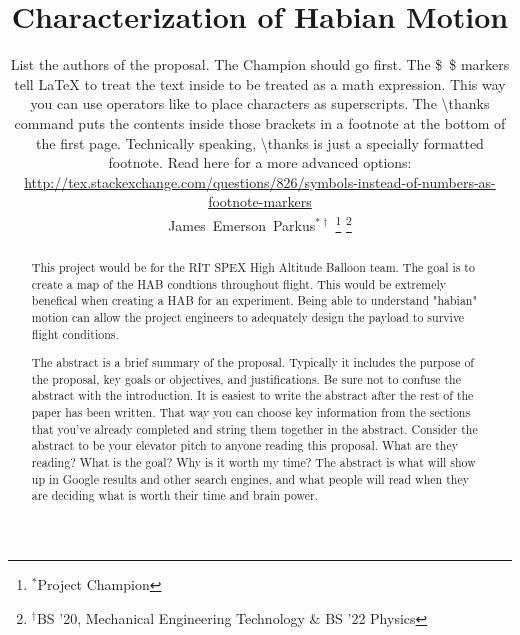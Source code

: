 \documentclass[journal]{SPEXformat}
\title{Characterization of Habian Motion}
\author{
  \begin{help}
    List the authors of the proposal. The Champion should go first.
    The \$~\$ markers tell \LaTeX{} to treat the text inside to be treated as a math expression. This way you can use operators like \textcaret{} to place characters as superscripts.
    The \textbackslash{}thanks command puts the contents inside those brackets in a footnote at the bottom of the first page. Technically speaking, \textbackslash{}thanks is just a specially formatted footnote.
    Read here for a more advanced options:  \url{http://tex.stackexchange.com/questions/826/symbols-instead-of-numbers-as-footnote-markers}
  \end{help}
  James~Emerson~Parkus$^{*\dagger}$%
    \thanks{$^{*}$Project Champion}%
    \thanks{$^{\dagger}$BS '20, Mechanical Engineering Technology \& BS '22 Physics}

}
\newenvironment{help}{
  \ttfamily\footnotesize\sloppy
  \begin{lrbox}{\helpbox}\begin{minipage}{\linewidth}
  }{
  \end{minipage}\end{lrbox}
  \ifbool{showhelp}{
    \fbox{\usebox{\helpbox}}
  }{}
}
\begin{document}
\maketitle%

\begin{abstract}
  This project would be for the RIT SPEX High Altitude Balloon team. The goal is to create a map of the HAB condtions throughout
  flight. This would be extremely benefical when creating a HAB for an experiment. Being able to understand "habian" motion
  can allow the project engineers to adequately design the payload to survive flight conditions.
    \begin{help}
      The abstract is a brief summary of the proposal. Typically it includes the purpose of the proposal, key goals or objectives, and justifications.
      Be sure not to confuse the abstract with the introduction.
      It is easiest to write the abstract after the rest of the paper has been written.
      That way you can choose key information from the sections that you've already completed and string them together in the abstract.
      Consider the abstract to be your elevator pitch to anyone reading this proposal.
      What are they reading?
      What is the goal?
      Why is it worth my time?
      The abstract is what will show up in Google results and other search engines, and what people will read when they are deciding what is worth their time and brain power.
    \end{help}
\end{abstract}

\label{sec:nomenclature}
\newcommand{\nomunit}[1]{%
\renewcommand{\nomentryend}{\hspace*{\fill}#1}}
\renewcommand{\nompreamble}{
  \begin{help}
    If you include mathematical expressions or express variables in the proposal, list them with their corresponding definitions here as a list.
    The two lines below make it look nice when defining units/values to constants.

    Note that math terms and non-math terms are separated and alphabetized, regardless of the order in which they are defined. (Recall terms \$like this\$ are in the math environment)
    Read more about advanced nomenclature formatting here:\\
    \url{https://www.sharelatex.com/learn/Nomenclatures}
  \end{help}
  }
\end{document}
